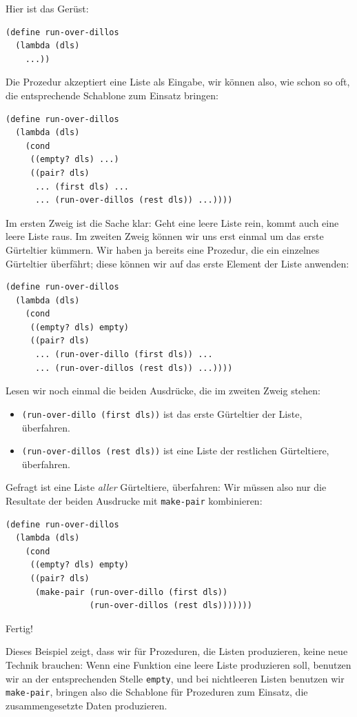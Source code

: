 Hier ist das Gerüst:
%
\begin{verbatim}
(define run-over-dillos
  (lambda (dls)
    ...))
\end{verbatim}
%
Die Prozedur akzeptiert eine Liste als Eingabe, wir können also, wie
schon so oft, die entsprechende Schablone zum Einsatz bringen:
%
\begin{verbatim}
(define run-over-dillos
  (lambda (dls)
    (cond
     ((empty? dls) ...)
     ((pair? dls)
      ... (first dls) ...
      ... (run-over-dillos (rest dls)) ...))))
\end{verbatim}
%
Im ersten Zweig ist die Sache klar: Geht eine leere Liste rein, kommt
auch eine leere Liste raus.  Im zweiten Zweig können wir uns erst
einmal um das erste Gürteltier kümmern.  Wir haben ja bereits eine
Prozedur, die ein einzelnes Gürteltier überfährt; diese können wir auf
das erste Element der Liste anwenden:
%
\begin{verbatim}
(define run-over-dillos
  (lambda (dls)
    (cond
     ((empty? dls) empty)
     ((pair? dls)
      ... (run-over-dillo (first dls)) ...
      ... (run-over-dillos (rest dls)) ...))))
\end{verbatim}
%
Lesen wir noch einmal die beiden Ausdrücke, die im zweiten Zweig
stehen:
%
\begin{itemize}
\item \texttt{(run-over-dillo (first dls))} ist das erste Gürteltier
  der Liste, überfahren.
\item \texttt{(run-over-dillos (rest dls))} ist eine Liste der
  restlichen Gürteltiere, überfahren.
\end{itemize}
%
Gefragt ist eine Liste \emph{aller} Gürteltiere, überfahren:
Wir müssen also nur die Resultate der beiden Ausdrucke mit
\texttt{make-pair} kombinieren:
%
\begin{verbatim}
(define run-over-dillos
  (lambda (dls)
    (cond
     ((empty? dls) empty)
     ((pair? dls)
      (make-pair (run-over-dillo (first dls))
                 (run-over-dillos (rest dls)))))))
\end{verbatim}
%
Fertig!

Dieses Beispiel zeigt, dass wir für Prozeduren, die Listen produzieren,
keine neue Technik brauchen: Wenn eine Funktion eine leere Liste
produzieren soll, benutzen wir an der entsprechenden Stelle
\texttt{empty}, und bei nichtleeren Listen benutzen wir
\texttt{make-pair}, bringen also die Schablone für Prozeduren zum
Einsatz, die zusammengesetzte Daten produzieren.

